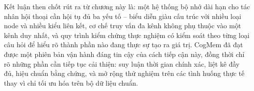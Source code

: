 \documentclass[../main.tex]{subfiles}
\begin{document}
Kết luận then chốt rút ra từ chương này là: một hệ thống bộ nhớ dài hạn cho tác nhân hội thoại cần hội tụ đủ ba yếu tố -- biểu diễn giàu cấu trúc với nhiều loại node và nhiều kiểu liên kết, cơ chế truy vấn đa kênh không phụ thuộc vào một kênh duy nhất, và quy trình kiểm chứng thực nghiệm có kiểm soát theo từng loại câu hỏi để hiểu rõ thành phần nào đang thực sự tạo ra giá trị. CogMem đã đạt được một phiên bản vận hành đáng tin cậy của cách tiếp cận này, đồng thời chỉ rõ những phần cần tiếp tục cải thiện: suy luận thời gian chính xác, liệt kê đầy đủ, hiệu chuẩn bằng chứng, và mở rộng thử nghiệm trên các tình huống thực tế thay vì chỉ tối ưu hóa trên bộ dữ liệu chuẩn.
\end{document}
